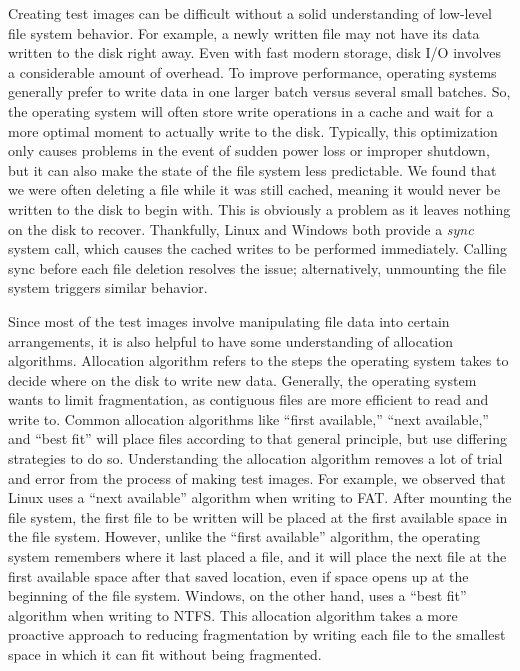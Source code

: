 Creating test images can be difficult without a solid understanding of low-level file system behavior.
For example, a newly written file may not have its data written to the disk right away.
Even with fast modern storage, disk I/O involves a considerable amount of overhead.
To improve performance, operating systems generally prefer to write data in one larger batch versus several small batches.
So, the operating system will often store write operations in a cache and wait for a more optimal moment to actually write to the disk.
Typically, this optimization only causes problems in the event of sudden power loss or improper shutdown, but it can also make the state of the file system less predictable.
We found that we were often deleting a file while it was still cached, meaning it would never be written to the disk to begin with.
This is obviously a problem as it leaves nothing on the disk to recover.
Thankfully, Linux and Windows both provide a \emph{sync} system call, which causes the cached writes to be performed immediately.
Calling sync before each file deletion resolves the issue; alternatively, unmounting the file system triggers similar behavior.

Since most of the test images involve manipulating file data into certain arrangements, it is also helpful to have some understanding of allocation algorithms.
Allocation algorithm refers to the steps the operating system takes to decide where on the disk to write new data.
Generally, the operating system wants to limit fragmentation, as contiguous files are more efficient to read and write to.
Common allocation algorithms like ``first available,'' ``next available,'' and ``best fit'' will place files according to that general principle, but use differing strategies to do so.
Understanding the allocation algorithm removes a lot of trial and error from the process of making test images.
For example, we observed that Linux uses a ``next available'' algorithm when writing to FAT.
After mounting the file system, the first file to be written will be placed at the first available space in the file system.
However, unlike the ``first available'' algorithm, the operating system remembers where it last placed a file, and it will place the next file at the first available space after that saved location, even if space opens up at the beginning of the file system.
Windows, on the other hand, uses a ``best fit'' algorithm when writing to NTFS.
This allocation algorithm takes a more proactive approach to reducing fragmentation by writing each file to the smallest space in which it can fit without being fragmented.


